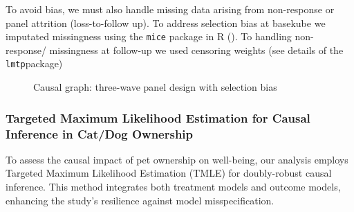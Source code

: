 \documentclass[
  singlecolumn,
  9pt]{article}
\begin{document}
To avoid bias, we must also handle missing data arising from
non-response or panel attrition (loss-to-follow up). To address
selection bias at basekube we imputated missingness using the
\texttt{mice} package in R (). To handling non-response/ missingness at follow-up we used
censoring weights (see details of the \texttt{lmtp}package)

\newpage{}

\begin{figure}


\caption{\label{fig-outcomewide-dag}Causal graph: three-wave panel
design with selection bias}

\end{figure}%

\newpage{}

\subsubsection{Targeted Maximum Likelihood Estimation for Causal
Inference in Cat/Dog
Ownership}\label{targeted-maximum-likelihood-estimation-for-causal-inference-in-catdog-ownership}

To assess the causal impact of pet ownership on well-being, our analysis
employs Targeted Maximum Likelihood Estimation (TMLE) for doubly-robust
causal inference. This method integrates both treatment models and
outcome models, enhancing the study's resilience against model
misspecification.
\end{document}
